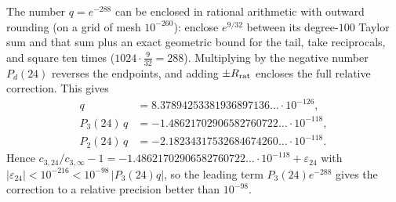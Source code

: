 \begin{remark}\label{rem:correction-numerics}
The number $q=e^{-288}$ can be enclosed in rational arithmetic with outward rounding (on a grid of mesh $10^{-260}$): enclose $e^{9/32}$ between its degree-$100$ Taylor sum and that sum plus an exact geometric bound for the tail, take reciprocals, and square ten times ($1024\cdot\frac9{32}=288$). Multiplying by the negative number $P_d(24)$ reverses the endpoints, and adding $\pm R_{\rm rat}$ encloses the full relative correction. This gives
\begin{align*}
q&=8.37894253381936897136\ldots\cdot10^{-126},\\
P_3(24)\,q&=-1.48621702906582760722\ldots\cdot10^{-118},\\
P_2(24)\,q&=-2.18234317532684674260\ldots\cdot10^{-118}.
\end{align*}
Hence $c_{3,24}/c_{3,\infty}-1=-1.48621702906582760722\ldots\cdot10^{-118}+\varepsilon_{24}$ with $|\varepsilon_{24}|<10^{-216}<10^{-98}\,|P_3(24)q|$, so the leading term $P_3(24)e^{-288}$ gives the correction to a relative precision better than $10^{-98}$.
\end{remark}
